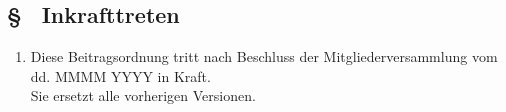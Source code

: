 \subsection{§ \theboparagraphcounter\ Inkrafttreten} \label{bo:par:inkrafttreten}
\begin{enumerate}
    \item \label{bo:abs:9v9j5x} Diese Beitragsordnung tritt nach Beschluss der Mitgliederversammlung vom dd. MMMM YYYY in Kraft. \\
    Sie ersetzt alle vorherigen Versionen.
\end{enumerate}